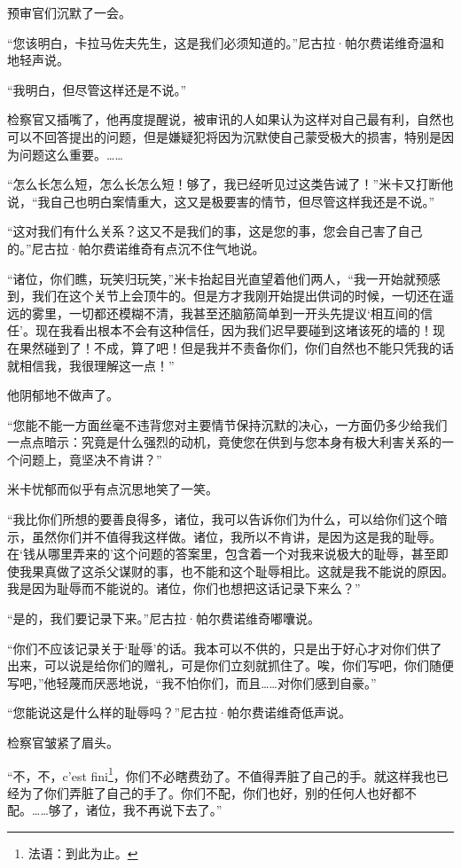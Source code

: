 \par 预审官们沉默了一会。
\par “您该明白，卡拉马佐夫先生，这是我们必须知道的。”尼古拉·帕尔费诺维奇温和地轻声说。
\par “我明白，但尽管这样还是不说。”
\par 检察官又插嘴了，他再度提醒说，被审讯的人如果认为这样对自己最有利，自然也可以不回答提出的问题，但是嫌疑犯将因为沉默使自己蒙受极大的损害，特别是因为问题这么重要。……
\par “怎么长怎么短，怎么长怎么短！够了，我已经听见过这类告诫了！”米卡又打断他说，“我自己也明白案情重大，这又是极要害的情节，但尽管这样我还是不说。”
\par “这对我们有什么关系？这又不是我们的事，这是您的事，您会自己害了自己的。”尼古拉·帕尔费诺维奇有点沉不住气地说。
\par “诸位，你们瞧，玩笑归玩笑，”米卡抬起目光直望着他们两人，“我一开始就预感到，我们在这个关节上会顶牛的。但是方才我刚开始提出供词的时候，一切还在遥远的雾里，一切都还模糊不清，我甚至还脑筋简单到一开头先提议‘相互间的信任’。现在我看出根本不会有这种信任，因为我们迟早要碰到这堵该死的墙的！现在果然碰到了！不成，算了吧！但是我并不责备你们，你们自然也不能只凭我的话就相信我，我很理解这一点！”
\par 他阴郁地不做声了。
\par “您能不能一方面丝毫不违背您对主要情节保持沉默的决心，一方面仍多少给我们一点点暗示：究竟是什么强烈的动机，竟使您在供到与您本身有极大利害关系的一个问题上，竟坚决不肯讲？”
\par 米卡忧郁而似乎有点沉思地笑了一笑。
\par “我比你们所想的要善良得多，诸位，我可以告诉你们为什么，可以给你们这个暗示，虽然你们并不值得我这样做。诸位，我所以不肯讲，是因为这是我的耻辱。在‘钱从哪里弄来的’这个问题的答案里，包含着一个对我来说极大的耻辱，甚至即使我果真做了这杀父谋财的事，也不能和这个耻辱相比。这就是我不能说的原因。我是因为耻辱而不能说的。诸位，你们也想把这话记录下来么？”
\par “是的，我们要记录下来。”尼古拉·帕尔费诺维奇嘟囔说。
\par “你们不应该记录关于‘耻辱’的话。我本可以不供的，只是出于好心才对你们供了出来，可以说是给你们的赠礼，可是你们立刻就抓住了。唉，你们写吧，你们随便写吧，”他轻蔑而厌恶地说，“我不怕你们，而且……对你们感到自豪。”
\par “您能说这是什么样的耻辱吗？”尼古拉·帕尔费诺维奇低声说。
\par 检察官皱紧了眉头。
\par “不，不，c’est fini\footnote{法语：到此为止。}，你们不必瞎费劲了。不值得弄脏了自己的手。就这样我也已经为了你们弄脏了自己的手了。你们不配，你们也好，别的任何人也好都不配。……够了，诸位，我不再说下去了。”
